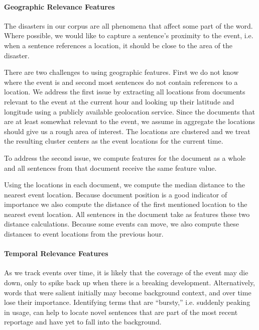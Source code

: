 

\paragraph{Geographic Relevance Features}
The disasters in our corpus are all phenomena that
affect some part of the word. 
Where possible, we would like to capture a sentence's proximity to the event,
i.e. when a sentence references a location, it should be close to the 
area of the disaster. 

There are two challenges to using geographic features. First we do not 
know where the event is and second most sentences do not contain references
to a location.
We address the first issue by extracting all locations from 
documents relevant to the event at the
current hour and looking up their latitude and 
longitude using a publicly available geolocation service. 
Since the documents that are at least somewhat relevant to the event,
we assume in aggregate the locations should give us a rough area of interest.
The locations are clustered %
and we treat the resulting cluster centers
as the event locations for the current time.


To address the second issue, 
we compute features for the document as a whole and all
sentences from that document receive the same feature value.

Using the locations in each document, we compute the median distance to the 
nearest event location. Because document position is a good indicator 
of importance we also compute the distance of the first mentioned
location to the nearest event location. All sentences in the document take
as features these two distance calculations.
Because some events can move, we also
compute these distances to event locations from the previous hour.



\paragraph{Temporal Relevance Features}
As we track events over time, it is likely that the coverage of the event 
may die down, only to spike back up when there is a breaking development.
Alternatively, words that were salient initially may become background context,
and over time lose their importance.
Identifying terms that are ``bursty,'' i.e. suddenly peaking in usage,
can help to locate novel sentences that are part of the most recent reportage
and have yet to fall into the background.


